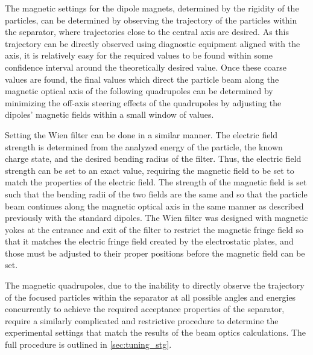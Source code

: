 The magnetic settings for the dipole magnets, determined by the rigidity of the
particles, can be determined by observing the trajectory of the particles within
the separator, where trajectories close to the central axis are desired. As this
trajectory can be directly observed using diagnostic equipment aligned with the
axis, it is relatively easy for the required values to be found within some
confidence interval around the theoretically desired value. Once these coarse
values are found, the final values which direct the particle beam along the
magnetic optical axis of the following quadrupoles can be determined by
minimizing the off-axis steering effects of the quadrupoles by adjusting the
dipoles' magnetic fields within a small window of values.

Setting the Wien filter can be done in a similar manner. The electric field
strength is determined from the analyzed energy of the particle, the known
charge state, and the desired bending radius of the filter. Thus, the electric
field strength can be set to an exact value, requiring the magnetic field to
be set to match the properties of the electric field. The strength of the
magnetic field is set such that the bending radii of the two fields are the
same and so that the particle beam continues along the magnetic optical axis in
the same manner as described previously with the standard dipoles. The
Wien filter was designed with magnetic yokes at the entrance and exit of the
filter to restrict the magnetic fringe field so that it matches the electric
fringe field created by the electrostatic plates, and those must be adjusted to
their proper positions before the magnetic field can be set.

The magnetic quadrupoles, due to the inability to directly observe the trajectory
of the focused particles within the separator at all possible angles and energies
concurrently to achieve the required acceptance properties of the separator,
require a similarly complicated and restrictive procedure to determine the
experimental settings that match the results of the beam optics calculations.
The full procedure is outlined in \ref{sec:tuning_stg}.


